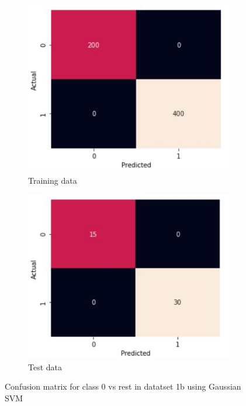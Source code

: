 \documentclass[11pt]{article}
\begin{document}
\begin{figure}[h]
\centering
	\begin{subfigure}[b]{0.45\textwidth}
	\centering
	\includegraphics[scale=0.5]{dataset1b_gauss_svm_0_cm_train.jpg}
	\caption{Training data}
	\label{fig:fig2.3.1.1}
	\end{subfigure}
	\begin{subfigure}[b]{0.45\textwidth}
	\centering
	\includegraphics[scale=0.5]{dataset1b_gauss_svm_0_cm_test.jpg}
	\caption{Test data}
	\label{fig:fig2.3.1.2}
	\end{subfigure}
\caption{Confusion matrix for class 0 vs rest in datatset 1b using Gaussian SVM}
\label{fig:fig2.3.1}
\end{figure}
\end{document}
